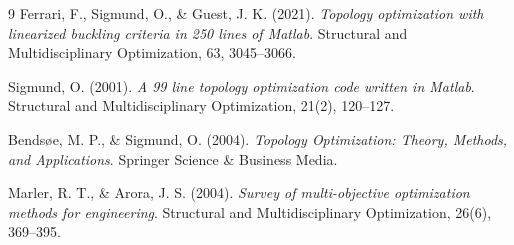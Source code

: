 \documentclass[11pt, a4paper]{article}
\begin{document}
\begin{thebibliography}{9}
Ferrari, F., Sigmund, O., \& Guest, J. K. (2021). 
\textit{Topology optimization with linearized buckling criteria in 250 lines of Matlab}. 
Structural and Multidisciplinary Optimization, 63, 3045--3066.

Sigmund, O. (2001).
\textit{A 99 line topology optimization code written in Matlab}.
Structural and Multidisciplinary Optimization, 21(2), 120--127.

Bends{\o}e, M. P., \& Sigmund, O. (2004).
\textit{Topology Optimization: Theory, Methods, and Applications}.
Springer Science \& Business Media.

Marler, R. T., \& Arora, J. S. (2004). 
\textit{Survey of multi-objective optimization methods for engineering}. 
Structural and Multidisciplinary Optimization, 26(6), 369--395.
\end{thebibliography}
\end{document}
